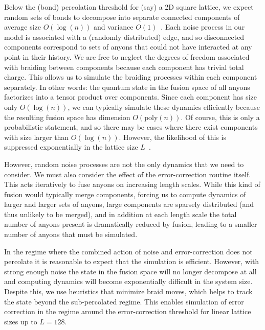 \documentclass[aps, prl, letterpaper, twocolumn, superscriptaddress, notitlepage, 10pt]{revtex4-1}
\begin{document}
Below the (bond) percolation threshold for (say) a 2D square lattice, we expect random sets of 
bonds to decompose into separate connected components 
of average size $O(\log(n))$ and variance $O(1)$~\cite{Bazant2000}.
Each noise process in our model is associated with a (randomly distributed) edge, and so 
disconnected components correspond to sets of anyons that could not have interacted at any 
point in their history. 
We are free to neglect the degrees of freedom associated with braiding between components 
because each component has trivial total charge.
This allows us to simulate the braiding processes within each component separately. 
In other words: the quantum state in the fusion space of all anyons factorizes into 
a tensor product over components. 
Since each 
component has size only $O(\log(n))$, we can typically simulate these dynamics efficiently 
because the resulting fusion space has dimension $O(\mathrm{poly}(n))$. 
Of course, this is only a probabilistic statement, and so there may be cases where there exist components with size larger than $O(\log(n))$. However, the likelihood of this is suppressed exponentially in the lattice size $L$~\cite{Grimmett1989}. 

However, random noise processes are not the only dynamics that we need to consider. We 
must also consider the effect of the error-correction routine itself. This acts iteratively to fuse 
anyons on increasing length scales. While this kind of fusion would typically merge components, 
forcing us to compute dynamics of larger and larger sets of anyons,
large components are sparsely distributed
(and thus unlikely to be merged), and in addition at each length scale the total number of 
anyons present is dramatically reduced by fusion, leading to a smaller number of anyons that 
must be simulated.

In the regime where the combined action of noise and error-correction does not percolate
it is reasonable to expect that the simulation is efficient.
However, with strong enough noise the state in the fusion space will
no longer decompose at all and computing dynamics will
become exponentially difficult in the system size.
Despite this, we use heuristics 
that minimize braid moves, which helps to
track the state beyond the
sub-percolated regime.
This enables simulation of error correction in
the regime around the error-correction threshold for linear lattice sizes up to $L=128$.

\end{document}
